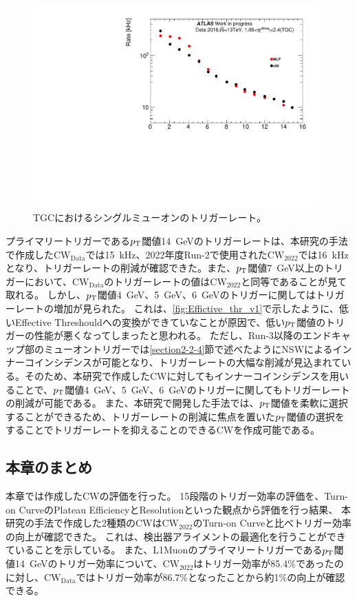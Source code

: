 \begin{figure}[tb]
  \centering
  \includegraphics[clip, width=11cm]{fig/5/15rate.pdf}
  \caption{TGCにおけるシングルミューオンのトリガーレート。}
  \label{fig:Ratev05v06}
\end{figure}
プライマリートリガーである$p_{\rm{T}}$閾値14~GeVのトリガーレートは、本研究の手法で作成した$\mathrm{CW_{Data}}$では15~kHz、2022年度Run-2で使用された$\mathrm{CW_{2022}}$では16~kHzとなり、トリガーレートの削減が確認できた。また、$p_{\rm{T}}$閾値7~GeV以上のトリガーにおいて、$\mathrm{CW_{Data}}$のトリガーレートの値は$\mathrm{CW_{2022}}$と同等であることが見て取れる。
しかし、$p_{\rm{T}}$閾値4~GeV、5~GeV、6~GeVのトリガーに関してはトリガーレートの増加が見られた。
これは、\ref{fig:Effictive_thr_v1}で示したように、低いEffective Threshouldへの変換ができていなことが原因で、低い$p_{\rm{T}}$閾値のトリガーの性能が悪くなってしまったと思われる。
ただし、Run-3以降のエンドキャップ部のミューオントリガーでは\ref{section2-2-4}節で述べたようにNSWによるインナーコインシデンスが可能となり、トリガーレートの大幅な削減が見込まれている。そのため、本研究で作成したCWに対してもインナーコインシデンスを用いることで、$p_{\rm{T}}$閾値4~GeV、5~GeV、6~GeVのトリガーに関してもトリガーレートの削減が可能である。
また、本研究で開発した手法では、$p_{\rm{T}}$閾値を柔軟に選択することができるため、トリガーレートの削減に焦点を置いた$p_{\rm{T}}$閾値の選択をすることでトリガーレートを抑えることのできるCWを作成可能である。



\subsection{本章のまとめ}
本章では作成したCWの評価を行った。
15段階のトリガー効率の評価を、Turn-on CurveのPlateau EfficiencyとResolutionといった観点から評価を行っ結果、
本研究の手法で作成した2種類のCWは$\mathrm{CW_{2022}}$のTurn-on Curveと比べトリガー効率の向上が確認できた。
これは、検出器アライメントの最適化を行うことができていることを示している。
また、L1Muonのプライマリートリガーである$p_{\rm{T}}$閾値14~GeVのトリガー効率について、$\mathrm{CW_{2022}}$はトリガー効率が85.4$\%$であったのに対し、$\mathrm{CW_{Data}}$ではトリガー効率が86.7$\%$となったことから約1$\%$の向上が確認できる。

